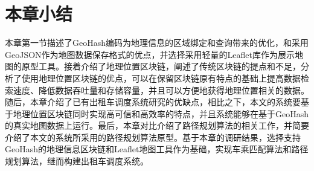 \section{本章小结}
本章第一节描述了GeoHash编码为地理信息的区域绑定和查询带来的优化，和采用GeoJSON作为地图数据保存格式的优点，并选择采用轻量的Leaflet库作为展示地图的原型工具。接着介绍了地理位置区块链，阐述了传统区块链的提点和不足，分析了使用地理位置区块链的优点，可以在保留区块链原有特点的基础上提高数据检索速度、降低数据吞吐量和存储容量，并且可以方便地获得地理位置相关的数据。随后，本章介绍了已有出租车调度系统研究的优缺点，相比之下，本文的系统要基于地理位置区块链同时实现高可信和高效率的特点，并且系统能够在基于GeoHash的真实地图数据上运行。最后，本章对比介绍了路径规划算法的相关工作，并简要介绍了本文的系统所采用的路径规划算法原型。基于本章的调研结果，选择支持GeoHash的地理信息区块链和Leaflet地图工具作为基础，实现车乘匹配算法和路径规划算法，继而构建出租车调度系统。